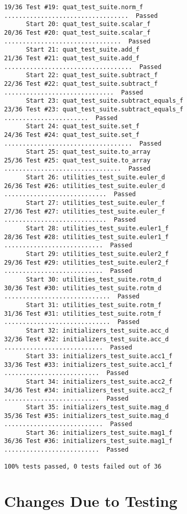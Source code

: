 \documentclass[12pt, titlepage]{article}
\begin{document}
\begin{small}
\begin{verbatim}
19/36 Test #19: quat_test_suite.norm_f ..................................  Passed
      Start 20: quat_test_suite.scalar_f
20/36 Test #20: quat_test_suite.scalar_f ................................  Passed
      Start 21: quat_test_suite.add_f
21/36 Test #21: quat_test_suite.add_f ...................................  Passed
      Start 22: quat_test_suite.subtract_f
22/36 Test #22: quat_test_suite.subtract_f ..............................  Passed
      Start 23: quat_test_suite.subtract_equals_f
23/36 Test #23: quat_test_suite.subtract_equals_f .......................  Passed
      Start 24: quat_test_suite.set_f
24/36 Test #24: quat_test_suite.set_f ...................................  Passed
      Start 25: quat_test_suite.to_array
25/36 Test #25: quat_test_suite.to_array ................................  Passed
      Start 26: utilities_test_suite.euler_d
26/36 Test #26: utilities_test_suite.euler_d ............................  Passed
      Start 27: utilities_test_suite.euler_f
27/36 Test #27: utilities_test_suite.euler_f ............................  Passed
      Start 28: utilities_test_suite.euler1_f
28/36 Test #28: utilities_test_suite.euler1_f ...........................  Passed
      Start 29: utilities_test_suite.euler2_f
29/36 Test #29: utilities_test_suite.euler2_f ...........................  Passed
      Start 30: utilities_test_suite.rotm_d
30/36 Test #30: utilities_test_suite.rotm_d .............................  Passed
      Start 31: utilities_test_suite.rotm_f
31/36 Test #31: utilities_test_suite.rotm_f .............................  Passed
      Start 32: initializers_test_suite.acc_d
32/36 Test #32: initializers_test_suite.acc_d ...........................  Passed
      Start 33: initializers_test_suite.acc1_f
33/36 Test #33: initializers_test_suite.acc1_f ..........................  Passed
      Start 34: initializers_test_suite.acc2_f
34/36 Test #34: initializers_test_suite.acc2_f ..........................  Passed
      Start 35: initializers_test_suite.mag_d
35/36 Test #35: initializers_test_suite.mag_d ...........................  Passed
      Start 36: initializers_test_suite.mag1_f
36/36 Test #36: initializers_test_suite.mag1_f ..........................  Passed

100% tests passed, 0 tests failed out of 36
\end{verbatim}
\end{small}

\section{Changes Due to Testing}
\end{document}
